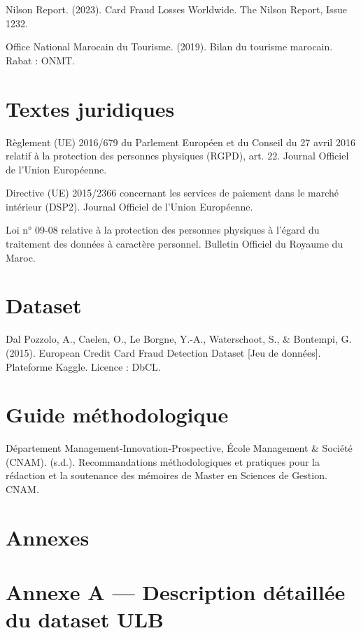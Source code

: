 Nilson Report. (2023). Card Fraud Losses Worldwide. The Nilson Report, Issue 1232.

Office National Marocain du Tourisme. (2019). Bilan du tourisme marocain. Rabat : ONMT.

\section{Textes juridiques}

Règlement (UE) 2016/679 du Parlement Européen et du Conseil du 27 avril 2016 relatif à la protection des personnes physiques (RGPD), art. 22. Journal Officiel de l'Union Européenne.

Directive (UE) 2015/2366 concernant les services de paiement dans le marché intérieur (DSP2). Journal Officiel de l'Union Européenne.

Loi n° 09-08 relative à la protection des personnes physiques à l'égard du traitement des données à caractère personnel. Bulletin Officiel du Royaume du Maroc.

\section{Dataset}

Dal Pozzolo, A., Caelen, O., Le Borgne, Y.-A., Waterschoot, S., \& Bontempi, G. (2015). European Credit Card Fraud Detection Dataset [Jeu de données]. Plateforme Kaggle. Licence : DbCL.

\section{Guide méthodologique}

Département Management-Innovation-Prospective, École Management \& Société (CNAM). (s.d.). Recommandations méthodologiques et pratiques pour la rédaction et la soutenance des mémoires de Master en Sciences de Gestion. CNAM.

\section{Annexes}

\section{Annexe A — Description détaillée du dataset ULB}

